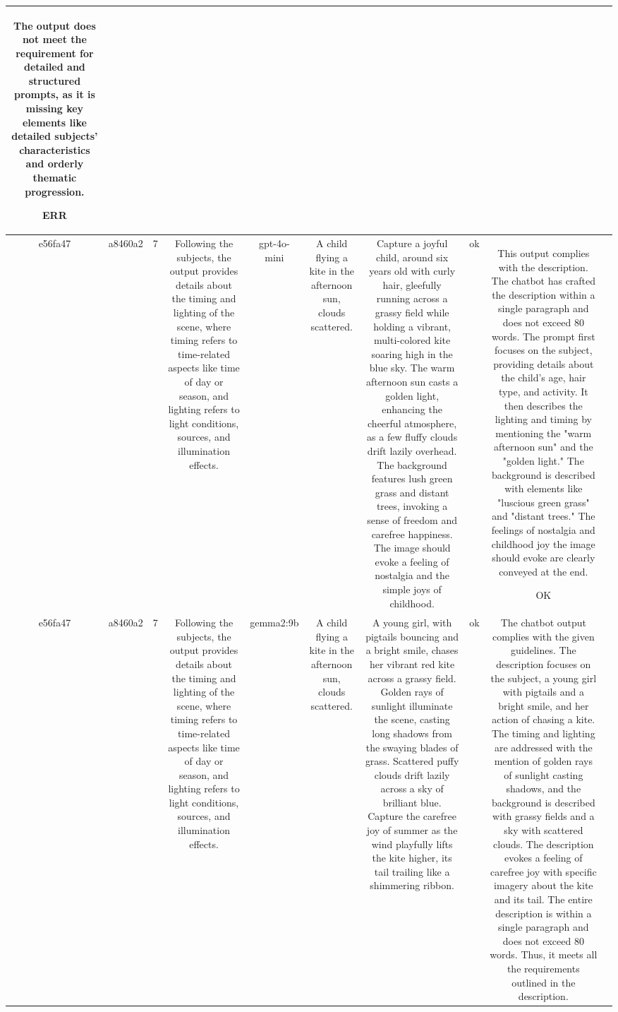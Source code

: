 \begin{table}[h!]
\begin{tabular}{|c|c|c|c|c|c|c|c|c|c|}
The output does not meet the requirement for detailed and structured prompts, as it is missing key elements like detailed subjects' characteristics and orderly thematic progression.

ERR & \\
\hline
e56fa47 & a8460a2 & 7 & Following the subjects, the output provides details about the timing and lighting of the scene, where timing refers to time-related aspects like time of day or season, and lighting refers to light conditions, sources, and illumination effects. & gpt-4o-mini & A child flying a kite in the afternoon sun, clouds scattered. & Capture a joyful child, around six years old with curly hair, gleefully running across a grassy field while holding a vibrant, multi-colored kite soaring high in the blue sky. The warm afternoon sun casts a golden light, enhancing the cheerful atmosphere, as a few fluffy clouds drift lazily overhead. The background features lush green grass and distant trees, invoking a sense of freedom and carefree happiness. The image should evoke a feeling of nostalgia and the simple joys of childhood. & ok & This output complies with the description. The chatbot has crafted the description within a single paragraph and does not exceed 80 words. The prompt first focuses on the subject, providing details about the child's age, hair type, and activity. It then describes the lighting and timing by mentioning the "warm afternoon sun" and the "golden light." The background is described with elements like "luscious green grass" and "distant trees." The feelings of nostalgia and childhood joy the image should evoke are clearly conveyed at the end. 

OK & \\
\hline
e56fa47 & a8460a2 & 7 & Following the subjects, the output provides details about the timing and lighting of the scene, where timing refers to time-related aspects like time of day or season, and lighting refers to light conditions, sources, and illumination effects. & gemma2:9b & A child flying a kite in the afternoon sun, clouds scattered. & A young girl, with pigtails bouncing and a bright smile, chases her vibrant red kite across a grassy field. Golden rays of sunlight illuminate the scene, casting long shadows from the swaying blades of grass. Scattered puffy clouds drift lazily across a sky of brilliant blue. Capture the carefree joy of summer as the wind playfully lifts the kite higher, its tail trailing like a shimmering ribbon.   
 & ok & The chatbot output complies with the given guidelines. The description focuses on the subject, a young girl with pigtails and a bright smile, and her action of chasing a kite. The timing and lighting are addressed with the mention of golden rays of sunlight casting shadows, and the background is described with grassy fields and a sky with scattered clouds. The description evokes a feeling of carefree joy with specific imagery about the kite and its tail. The entire description is within a single paragraph and does not exceed 80 words. Thus, it meets all the requirements outlined in the description.


\end{tabular}
\end{table}
